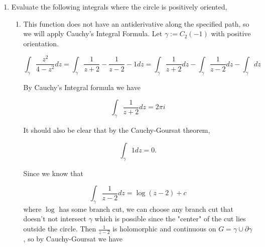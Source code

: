 \documentclass{article}
\newcommand{\Log}{\text{Log}}
\newcommand{\Arg}{\text{Arg}}
\begin{document}
\begin{enumerate}
\begin{enumerate}
		
		\item $\gamma_2(t)=e^{it}, \frac{\pi}{2}\leq t \leq \frac{3\pi}{2}$
		
		For this problem, we must redefine the $\Log$ function since taking the principle logarithm over the given interval would prove unfruitful. I will denote the new branch of the logarithm with $\Log^*(z)=\ln|z|+\Arg^*(z)$ where $\Arg^*(z) \in [0, 2\pi )$. Then in a fashion like the previous part,
		
		\[\int_{\gamma_2}z^i dz = \int_{\gamma_2}e^{i\Log^*(z)}dz \]
		\[=\int_{\pi/2}^{3\pi/2}e^{i(\ln|e^{it}|+i\Arg^*(e^{it}))}ie^{it}dt= \int_{\pi/2}^{3\pi/2}e^{i(it)}ie^{it}dt\]
		\[=\int_{\pi/2}^{3\pi/2}ie^{it-t}dt=\left[\frac{e^{it-t}}{2}-\frac{ie^{it-t}}{2} \right]_{\pi/2}^{3\pi/2} \]
		\[= \frac{e^{i\frac{3\pi}{2}-\frac{3\pi}{2}}}{2} - \frac{ie^{i\frac{3\pi}{2}-\frac{3\pi}{2}}}{2} - \frac{e^{i\frac{\pi}{2}-\frac{\pi}{2}}}{2} + \frac{ie^{i\frac{3\pi}{2}-\frac{3\pi}{2}}}{2}  \]
		\[=-\frac{ie^{\frac{-3\pi}{2}}}{2} - \frac{e^{\frac{-3\pi}{2}}}{2} - \frac{ie^{\frac{-\pi}{2}}}{2}-\frac{e^{\frac{-\pi}{2}}}{2} \]
		\[=\frac{-e^{\frac{-3\pi}{2}}-e^{\frac{-\pi}{2}}}{2} + i\frac{-e^{\frac{-3\pi}{2}}-e^{\frac{-\pi}{2}}}{2} \]
	\end{enumerate}
	
	\item Evaluate the following integrals where the circle is positively oriented,
	\begin{enumerate}
		\item This function does not have an antiderivative along the specified path, so we will apply Cauchy's Integral Formula. Let $\gamma := C_2(-1)$ with positive orientation.
		
		\[\int_{\gamma}\frac{z^2}{4-z^2}dz=\int_{\gamma}\frac{1}{z+2}-\frac{1}{z-2}-1dz = \int_{\gamma}\frac{1}{z+2}dz - \int_{\gamma}\frac{1}{z-2}dz-\int_{\gamma}dz \]
		
		By Cauchy's Integral formula we have
		
		\[\int_{\gamma}\frac{1}{z+2}dz=2\pi i \]
		
		It should also be clear that by the Cauchy-Goursat theorem,
		
		\[\int_{\gamma}1dz = 0.\]
		
		Since we know that 
		
		\[\int_{\gamma}\frac{1}{z-2}dz=\log(z-2)+c \]
		where $\log$ has some branch cut, we can choose any branch cut that doesn't not intersect $\gamma$ which is possible since the "center" of the cut lies outside the circle. Then $\frac{1}{z-2}$ is holomorphic and continuous on $G=\gamma \cup \partial\gamma$, so by Cauchy-Goursat we have
		

\end{enumerate}
\end{enumerate}
\end{document}
